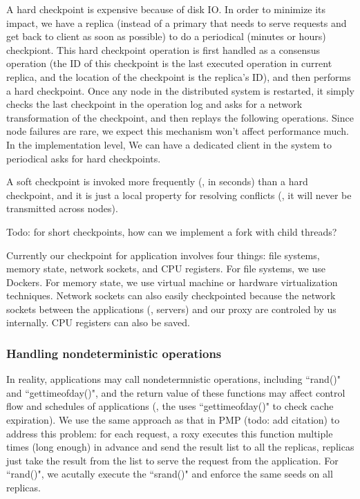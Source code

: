 A hard checkpoint is expensive because of disk IO. In order to minimize its 
impact, we have a replica (instead of a primary that needs to serve requests 
and get back to client as soon as possible) to do a periodical (minutes or hours) checkpiont. This 
hard checkpoint operation is first handled as a \paxos consensus operation (the 
ID of this checkpoint is the last executed \paxos operation in current 
replica, and the location of the checkpoint is the replica's ID), and then performs a hard checkpoint.
Once any node in the distributed 
system is restarted, it simply checks the last checkpoint in the \paxos 
operation log and asks for a network transformation of the checkpoint, and 
then replays the following operations. Since node failures are rare, we expect 
this mechanism won't affect performance much. In the implementation level, We can have a dedicated
client in the system to periodical asks for hard checkpoints.

A soft checkpoint is invoked more frequently (\eg, in seconds) than a hard 
checkpoint, and it is just a local property for resolving conflicts (\ie, it will never 
be transmitted across nodes).

Todo: for short checkpoints, how can we implement a fork with child threads?

Currently our checkpoint for application involves four things: file systems, memory state,
network sockets, and CPU registers. For file systems, we use Dockers.
For memory state, we use virtual machine or hardware virtualization 
techniques. Network sockets can also easily checkpointed because the network 
sockets between the applications (\eg, servers) and our proxy are controled by 
us internally. CPU registers can also be saved.

\subsubsection{Handling nondeterministic operations} \label{sec:rep-nondet}
In reality, applications may call nondetermnistic operations, including 
``rand()" and ``gettimeofday()", and the return value of these functions may 
affect control flow and schedules of applications (\eg, the \apache uses 
``gettimeofday()" to check cache expiration). We use the same approach as that 
in PMP (todo: add citation) to address this problem: for each request, a \msmr roxy executes
this function multiple times (long enough) in advance and send the result list to all the replicas,
replicas just take the result from the list to serve the request from the 
application. For ``rand()", we acutally execute the ``srand()" and enforce the 
same seeds on all replicas.

